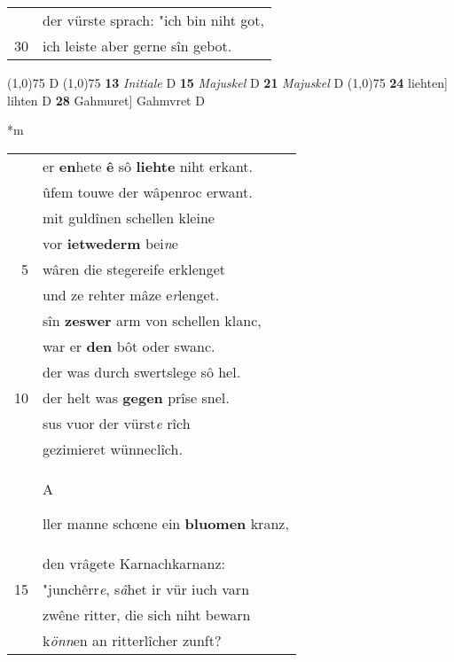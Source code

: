 \documentclass[8pt,a4paper,notitlepage]{article}
\begin{document}
\begin{table}[ht]
\begin{minipage}[t]{0.5\linewidth}
\begin{tabular}{rl}
 & der vürste sprach: "ich bin niht got,\\ 
30 & ich leiste aber gerne sîn gebot.\\ 
\end{tabular}
\scriptsize
\line(1,0){75} \newline
D \newline
\line(1,0){75} \newline
\textbf{13} \textit{Initiale} D  \textbf{15} \textit{Majuskel} D  \textbf{21} \textit{Majuskel} D  \newline
\line(1,0){75} \newline
\textbf{24} liehten] lihten D \textbf{28} Gahmuret] Gahmvret D \newline
\end{minipage}
\hspace{0.5cm}
\begin{minipage}[t]{0.5\linewidth}
\small
\begin{center}*m
\end{center}
\begin{tabular}{rl}
 & er \textbf{en}hete \textbf{ê} sô \textbf{liehte} niht erkant.\\ 
 & ûfem touwe der wâpenroc erwant.\\ 
 & mit guldînen schellen kleine\\ 
 & vor \textbf{ietwederm} bei\textit{n}e\\ 
5 & wâren die stegereife erklenget\\ 
 & und ze rehter mâze e\textit{r}lenget.\\ 
 & sîn \textbf{zeswer} arm von schellen klanc,\\ 
 & war er \textbf{den} bôt oder swanc.\\ 
 & der was durch swertslege sô hel.\\ 
10 & der helt was \textbf{gegen} prîse snel.\\ 
 & sus vuor der vürst\textit{e} rîch\\ 
 & gezimieret wünneclîch.\\ 
 & \begin{large}A\end{large}ller manne schœne ein \textbf{bluomen} kranz,\\ 
 & den vrâgete Karnachkarnanz:\\ 
15 & "junchêrr\textit{e}, s\textit{â}het ir vür iuch varn\\ 
 & zwêne ritter, die sich niht bewarn\\ 
 & k\textit{önn}en an ritterlîcher zunft?\\ 

\end{tabular}
\end{minipage}
\end{table}
\end{document}
